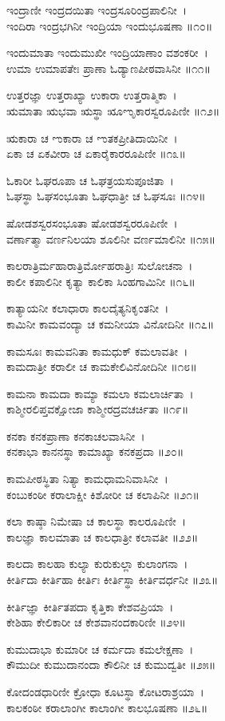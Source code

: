 ಇಂದ್ರಾಣೀ ಇಂದ್ರದಯಿತಾ ಇಂದ್ರಸೂರಿಂದ್ರಪಾಲಿನೀ~।\\
ಇಂದಿರಾ ಇಂದ್ರಭಗಿನೀ ಇಂದ್ರಿಯಾ ಇಂದುಭೂಷಣಾ ॥೧೦॥

ಇಂದುಮಾತಾ ಇಂದುಮುಖೀ ಇಂದ್ರಿಯಾಣಾಂ ವಶಂಕರೀ~।\\
ಉಮಾ ಉಮಾಪತೇಃ ಪ್ರಾಣಾ ಓಡ್ಯಾಣಪೀಠವಾಸಿನೀ ॥೧೧॥

ಉತ್ತರಜ್ಞಾ ಉತ್ತರಾಖ್ಯಾ ಉಕಾರಾ ಉತ್ತರಾತ್ಮಿಕಾ~।\\
ಋಮಾತಾ ಋಭವಾ ಋಸ್ಥಾ ೠಌೃಕಾರಸ್ವರೂಪಿಣೀ ॥೧೨॥

ಋಕಾರಾ ಚ ಌಕಾರಾ ಚ ಌತಕಪ್ರೀತಿದಾಯಿನೀ~।\\
ಏಕಾ ಚ ಏಕವೀರಾ ಚ ಏಕಾರೈಕಾರರೂಪಿಣೀ ॥೧೩॥

ಓಕಾರೀ ಓಘರೂಪಾ ಚ ಓಘತ್ರಯಸುಪೂಜಿತಾ~।\\
ಓಘಸ್ಥಾ ಓಘಸಂಭೂತಾ ಓಘಧಾತ್ರೀ ಚ ಓಘಸೂಃ ॥೧೪॥

ಷೋಡಶಸ್ವರಸಂಭೂತಾ ಷೋಡಶಸ್ವರರೂಪಿಣೀ~।\\
ವರ್ಣಾತ್ಮಾ ವರ್ಣನಿಲಯಾ ಶೂಲಿನೀ ವರ್ಣಮಾಲಿನೀ ॥೧೫॥

ಕಾಲರಾತ್ರಿರ್ಮಹಾರಾತ್ರಿರ್ಮೋಹರಾತ್ರಿಃ ಸುಲೋಚನಾ~।\\
ಕಾಲೀ ಕಪಾಲಿನೀ ಕೃತ್ಯಾ ಕಾಲಿಕಾ ಸಿಂಹಗಾಮಿನೀ ॥೧೬॥

ಕಾತ್ಯಾಯನೀ ಕಲಾಧಾರಾ ಕಾಲದೈತ್ಯನಿಕೃಂತನೀ~।\\
ಕಾಮಿನೀ ಕಾಮವಂದ್ಯಾ ಚ ಕಮನೀಯಾ ವಿನೋದಿನೀ ॥೧೭॥

ಕಾಮಸೂಃ ಕಾಮವನಿತಾ ಕಾಮಧುಕ್ ಕಮಲಾವತೀ~।\\
ಕಾಮದಾತ್ರೀ ಕರಾಲೀ ಚ ಕಾಮಕೇಲಿವಿನೋದಿನೀ ॥೧೮॥

ಕಾಮನಾ ಕಾಮದಾ ಕಾಮ್ಯಾ ಕಮಲಾ ಕಮಲಾರ್ಚಿತಾ~।\\
ಕಾಶ್ಮೀರಲಿಪ್ತವಕ್ಷೋಜಾ ಕಾಶ್ಮೀರದ್ರವಚರ್ಚಿತಾ ॥೧೯॥

ಕನಕಾ ಕನಕಪ್ರಾಣಾ ಕನಕಾಚಲವಾಸಿನೀ~।\\
ಕನಕಾಭಾ ಕಾನನಸ್ಥಾ ಕಾಮಾಖ್ಯಾ ಕನಕಪ್ರದಾ ॥೨೦॥

ಕಾಮಪೀಠಸ್ಥಿತಾ ನಿತ್ಯಾ ಕಾಮಧಾಮನಿವಾಸಿನೀ~।\\
ಕಂಬುಕಂಠೀ ಕರಾಲಾಕ್ಷೀ ಕಿಶೋರೀ ಚ ಕಲಾಪಿನೀ ॥೨೧॥

ಕಲಾ ಕಾಷ್ಠಾ ನಿಮೇಷಾ ಚ ಕಾಲಸ್ಥಾ ಕಾಲರೂಪಿಣೀ~।\\
ಕಾಲಜ್ಞಾ ಕಾಲಮಾತಾ ಚ ಕಾಲಧಾತ್ರೀ ಕಲಾವತೀ ॥೨೨॥

ಕಾಲದಾ ಕಾಲಹಾ ಕುಲ್ಯಾ ಕುರುಕುಲ್ಲಾ ಕುಲಾಂಗನಾ~।\\
ಕೀರ್ತಿದಾ ಕೀರ್ತಿಹಾ ಕೀರ್ತಿಃ ಕೀರ್ತಿಸ್ಥಾ ಕೀರ್ತಿವರ್ಧನೀ ॥೨೩॥

ಕೀರ್ತಿಜ್ಞಾ ಕೀರ್ತಿತಪದಾ ಕೃತ್ತಿಕಾ ಕೇಶವಪ್ರಿಯಾ~।\\
ಕೇಶಿಹಾ ಕೇಲಿಕಾರೀ ಚ ಕೇಶವಾನಂದಕಾರಿಣೀ ॥೨೪॥

ಕುಮುದಾಭಾ ಕುಮಾರೀ ಚ ಕರ್ಮದಾ ಕಮಲೇಕ್ಷಣಾ~।\\
ಕೌಮುದೀ ಕುಮುದಾನಂದಾ ಕೌಲಿನೀ ಚ ಕುಮುದ್ವತೀ ॥೨೫॥

ಕೋದಂಡಧಾರಿಣೀ ಕ್ರೋಧಾ ಕೂಟಸ್ಥಾ ಕೋಟರಾಶ್ರಯಾ~।\\
ಕಾಲಕಂಠೀ ಕರಾಲಾಂಗೀ ಕಾಲಾಂಗೀ ಕಾಲಭೂಷಣಾ ॥೨೬॥

